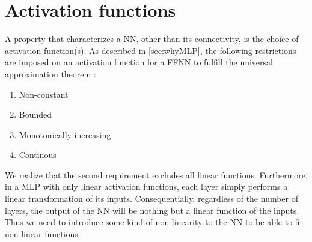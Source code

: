 \documentclass[twoside,english]{uiofysmaster}
\begin{document}
\section{Activation functions} \label{sec:activationFunctions}
A property that characterizes a NN, other than its connectivity, is the choice of activation function(s). 
As described in \autoref{sec:whyMLP}, the following restrictions are imposed on an activation function for a FFNN
to fulfill the universal approximation theorem \cite{Hornik89}:
\begin{enumerate}
 \item Non-constant
 \item Bounded
 \item Monotonically-increasing
 \item Continous
\end{enumerate}
We realize that the second requirement excludes all linear functions. Furthermore, in a MLP with only linear activation functions, each 
layer simply performs a linear transformation of its inputs. Consequentially, regardless of the number of layers, 
the output of the NN will be nothing but a linear function of the inputs. Thus we need to introduce some kind of 
non-linearity to the NN to be able to fit non-linear functions. 
\end{document}
